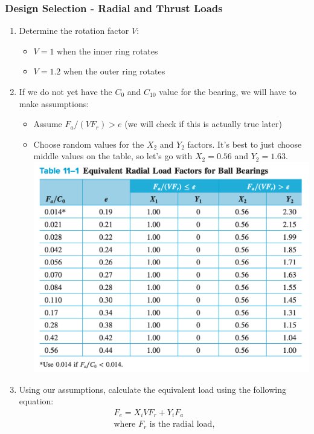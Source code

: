 \documentclass[11pt, fleqn]{article}
\begin{document}
\subsubsection{Design Selection - Radial and Thrust Loads}
\begin{enumerate}
    \item Determine the rotation factor $V$:
    \begin{itemize}
        \item $V=1$ when the inner ring rotates
        \item $V=1.2$ when the outer ring rotates
    \end{itemize}
    \item If we do not yet have the $C_{0}$ and $C_{10}$ value for the bearing, we will have to make assumptions:
    \begin{itemize}
        \item Assume $F_{a}/(VF_r)>e$ (we will check if this is actually true later)
        \item Choose random values for the $X_2$ and $Y_2$ factors. It's best to just choose middle values on the table, so let's go with $X_2 = 0.56$ and $Y_2 = 1.63$.\\
        \includegraphics[scale=0.65]{Bearings/equivalent-radial-load-factors.png}
    \end{itemize}
    \item Using our assumptions, calculate the equivalent load using the following equation:
    \begin{align*}
        F_e=X_iVF_r+Y_iF_a\\
        \text{where $F_r$ is the radial load,}\\

\end{align*}
\end{enumerate}
\end{document}
